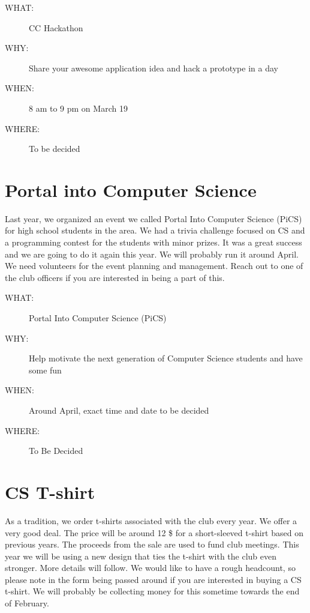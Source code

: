 \begin{description}
\item[{WHAT:}] CC Hackathon
\item[{WHY:}] Share your awesome application idea and hack a prototype in a day
\item[{WHEN:}] 8 am to 9 pm on March 19
\item[{WHERE:}] To be decided
\end{description}


\newpage


\section{Portal into Computer Science}
\label{sec-9}

Last year, we organized an event we called Portal Into Computer Science (PiCS)
for high school students in the area. We had a trivia challenge focused on CS
and a programming contest for the students with minor prizes. It was a great
success and we are going to do it again this year. We will probably run it
around April. We need volunteers for the event planning and management. Reach
out to one of the club officers if you are interested in being a part of this.

\begin{description}
\item[{WHAT:}] Portal Into Computer Science (PiCS)
\item[{WHY:}] Help motivate the next generation of Computer Science students and have some fun
\item[{WHEN:}] Around April, exact time and date to be decided
\item[{WHERE:}] To Be Decided
\end{description}


\newpage


\section{CS T-shirt}
\label{sec-10}

As a tradition, we order t-shirts associated with the club every year. We offer
a very good deal. The price will be around 12 \$ for a short-sleeved t-shirt
based on previous years. The proceeds from the sale are used to fund club
meetings. This year we will be using a new design that ties the t-shirt with
the club even stronger. More details will follow. We would like to have a rough
headcount, so please note in the form being passed around if you are interested
in buying a CS t-shirt. We will probably be collecting money for this sometime
towards the end of February.

